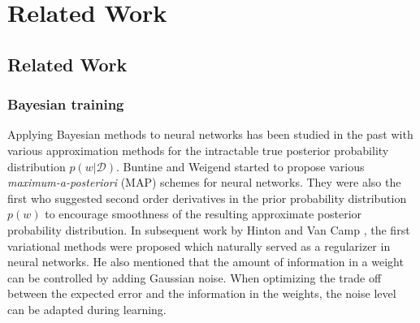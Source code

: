 \chapter{Related Work}

\ifpdf
    \graphicspath{{Chapter3/Figs/Raster/}{Chapter3/Figs/PDF/}{Chapter3/Figs/}}
\else
    \graphicspath{{Chapter3/Figs/Vector/}{Chapter3/Figs/}}
\fi


\pagebreak

\section{Related Work}

\subsection{Bayesian training}
Applying Bayesian methods to neural networks has been studied in the past with various approximation methods for the intractable true posterior probability distribution $p(w|\mathcal{D})$. Buntine and Weigend \cite{buntine1991bayesian} started to propose various \textit{maximum-a-posteriori} (MAP) schemes for neural networks. They were also the first who suggested second order derivatives in the prior probability distribution $p(w)$ to encourage smoothness of the resulting approximate posterior probability distribution.
In subsequent work by Hinton and Van Camp \cite{hinton1993keeping}, the first variational methods were proposed which naturally served as a regularizer in neural networks. He also mentioned that the amount of information in a weight can be controlled by adding Gaussian noise. When optimizing the trade off between the expected error and the information in the weights, the noise level can be adapted during learning.


